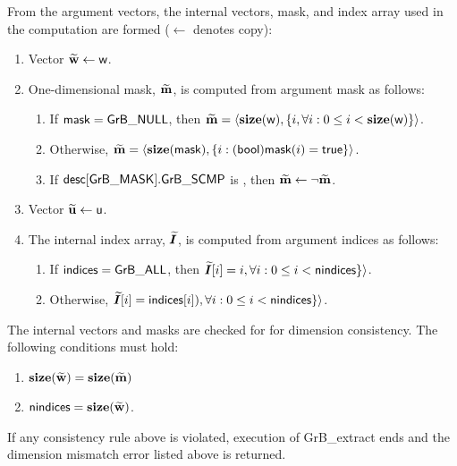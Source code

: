 From the argument vectors, the internal vectors, mask, and index array used in 
the computation are formed ($\leftarrow$ denotes copy):
\begin{enumerate}
	\item Vector ${\bf \widetilde{w}} \leftarrow {\sf w}$.

	\item One-dimensional mask, ${\bf \widetilde{m}}$, is computed from 
    argument {\sf mask} as follows:
	\begin{enumerate}
		\item	If ${\sf mask} = {\sf GrB\_NULL}$, then ${\bf \widetilde{m}} = 
        \langle \bold{size}({\sf w}), \{i, \forall i : 0 \leq i < 
        \bold{size}({\sf w}) \} \rangle$.

		\item	Otherwise, ${\bf \widetilde{m}} = 
        \langle \bold{size}({\sf mask}), \{i : ({\sf bool}){\sf mask}(i) = 
        {\sf true}\} \rangle$.

		\item	If ${\sf desc[GrB\_MASK].GrB\_SCMP}$ is \true, then 
        ${\bf \widetilde{m}} \leftarrow \neg {\bf \widetilde{m}}$.
	\end{enumerate}

	\item Vector ${\bf \widetilde{u}} \leftarrow {\sf u}$.
    
    \item The internal index array, $\bm{\widetilde{I}}$, is computed from 
    argument {\sf indices} as follows:
	\begin{enumerate}
		\item	If ${\sf indices} = {\sf GrB\_ALL}$, then 
        $\bm{\widetilde{I}}[i] = i, \forall i : 0 \leq i < {\sf nindices} \}
        \rangle$.

		\item	Otherwise, $\bm{\widetilde{I}}[i] = {\sf indices}[i]), 
        \forall i : 0 \leq i < {\sf nindices} \} \rangle$.
    \end{enumerate}
\end{enumerate}

The internal vectors and masks are checked for for dimension consistency. 
The following conditions must hold:
\begin{enumerate}
	\item $\bold{size}({\bf \widetilde{w}}) = \bold{size}({\bf \widetilde{m}})$
    \item ${\sf nindices} = \bold{size}({\bf \widetilde{w}})$.
\end{enumerate}
If any consistency rule above is violated, execution of {\sf GrB\_extract} ends and 
the dimension mismatch error listed above is returned.

